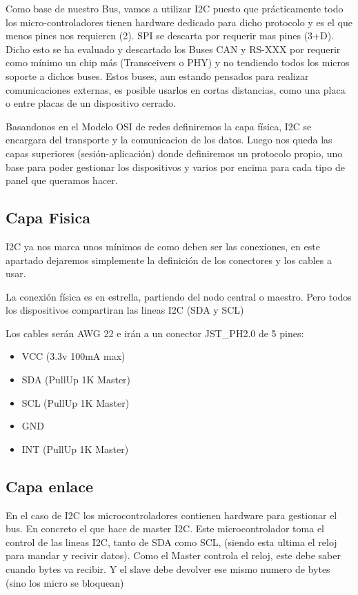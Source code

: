
Como base de nuestro Bus, vamos a utilizar I2C puesto que prácticamente todo los micro-controladores tienen %
hardware dedicado para dicho protocolo y es el que menos pines nos requieren (2). SPI se descarta por requerir
mas pines (3+D). Dicho esto se ha evaluado y descartado los Buses CAN y RS-XXX por requerir como mínimo un chip %
más (Transceivers o PHY) y no tendiendo todos los micros soporte a dichos buses. Estos buses, aun estando
pensados para realizar comunicaciones externas, es posible usarlos en cortas distancias, como una placa o entre
placas de un dispositivo cerrado.

Basandonos en el Modelo OSI de redes definiremos la capa física, I2C se encargara del transporte y la
comunicacion de los datos. Luego nos queda las capas superiores (sesión-aplicación) donde definiremos un %
protocolo propio, uno base para poder gestionar los dispositivos y varios por encima para cada tipo de panel
que queramos hacer.

\subsection{Capa Fisica}
I2C ya nos marca unos mínimos de como deben ser las conexiones, en este apartado dejaremos simplemente la
definición de los conectores y los cables a usar.

La conexión física es en estrella, partiendo del nodo central o maestro. Pero todos los dispositivos compartiran
las lineas I2C (SDA y SCL)

Los cables serán AWG 22 e irán a un conector JST\_PH2.0 de 5 pines:

\begin{itemize}
    \item{} VCC (3.3v 100mA max)
    \item{} SDA (PullUp 1K Master)
    \item{} SCL (PullUp 1K Master)
    \item{} GND
    \item{} INT (PullUp 1K Master)
\end{itemize}


\subsection{Capa enlace}
En el caso de I2C los microcontroladores contienen hardware para gestionar el bus. En concreto el que hace de
master I2C. Este microcontrolador toma el control de las lineas I2C, tanto de SDA como SCL, (siendo esta ultima
el reloj para mandar y recivir datos). Como el Master controla el reloj, este debe saber cuando bytes va recibir.
Y el slave debe devolver ese mismo numero de bytes (sino los micro se bloquean)

